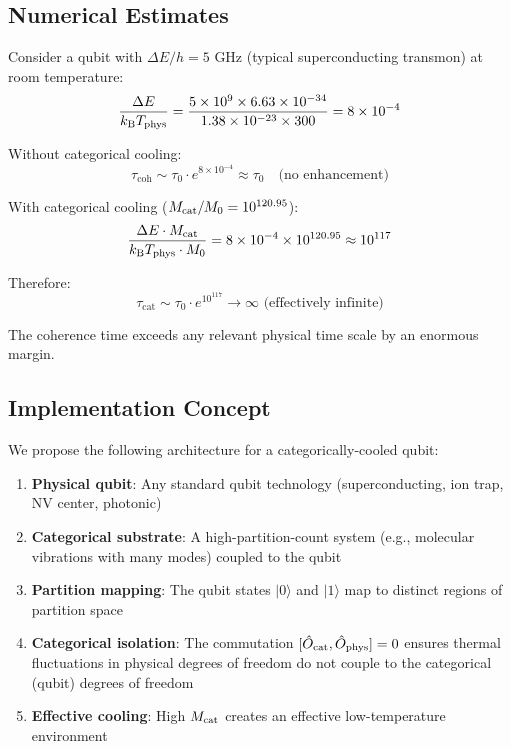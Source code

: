 \subsection{Numerical Estimates}

Consider a qubit with $\Delta E / h = 5$ GHz (typical superconducting transmon) at room temperature:
\begin{equation}
\frac{\Delta E}{k_{\mathrm{B}} T_{\mathrm{phys}}} = \frac{5 \times 10^9 \times 6.63 \times 10^{-34}}{1.38 \times 10^{-23} \times 300} = 8 \times 10^{-4}
\end{equation}

Without categorical cooling:
\begin{equation}
\tau_{\text{coh}} \sim \tau_0 \cdot e^{8 \times 10^{-4}} \approx \tau_0 \quad \text{(no enhancement)}
\end{equation}

With categorical cooling ($M_{\mathrm{cat}}/M_0 = 10^{120.95}$):
\begin{equation}
\frac{\Delta E \cdot M_{\mathrm{cat}}}{k_{\mathrm{B}} T_{\mathrm{phys}} \cdot M_0} = 8 \times 10^{-4} \times 10^{120.95} \approx 10^{117}
\end{equation}

Therefore:
\begin{equation}
\tau_{\text{cat}} \sim \tau_0 \cdot e^{10^{117}} \to \infty \text{ (effectively infinite)}
\end{equation}

The coherence time exceeds any relevant physical time scale by an enormous margin.

\subsection{Implementation Concept}

We propose the following architecture for a categorically-cooled qubit:

\begin{enumerate}
    \item \textbf{Physical qubit}: Any standard qubit technology (superconducting, ion trap, NV center, photonic)

    \item \textbf{Categorical substrate}: A high-partition-count system (e.g., molecular vibrations with many modes) coupled to the qubit

    \item \textbf{Partition mapping}: The qubit states $|0\rangle$ and $|1\rangle$ map to distinct regions of partition space

    \item \textbf{Categorical isolation}: The commutation $[\hat{O}_{\mathrm{cat}}, \hat{O}_{\mathrm{phys}}] = 0$ ensures thermal fluctuations in physical degrees of freedom do not couple to the categorical (qubit) degrees of freedom

    \item \textbf{Effective cooling}: High $M_{\mathrm{cat}}$ creates an effective low-temperature environment
\end{enumerate}

